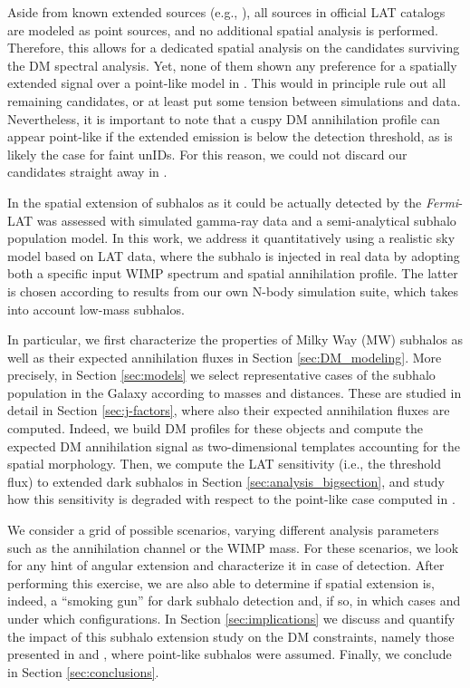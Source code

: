 \documentclass[%
 reprint,
nofootinbib,
 amsmath,amssymb,
 aps,
]{revtex4-2}
\begin{document}
Aside from known extended sources (e.g., \cite{Ackermann_2018}), all sources in official LAT catalogs \cite{2015ApJS..218...23A, 2016ApJS..222....5A, 2017ApJS..232...18A, 2020ApJS..247...33A} are modeled as point sources, and no additional spatial analysis is performed. Therefore, this allows for a dedicated spatial analysis on the candidates surviving the DM spectral analysis. Yet, none of them shown any preference for a spatially extended signal over a point-like model in . This would in principle rule out all remaining candidates, or at least put some tension between simulations and data. Nevertheless, it is important to note that a cuspy DM annihilation profile can appear point-like if the extended emission is below the detection threshold, as is likely the case for faint unIDs. For this reason, we could not discard our candidates straight away in .

{  In \cite{Mauro2020} the spatial extension of subhalos as it could be actually detected by the \textit{Fermi}-LAT was assessed with simulated gamma-ray data and a semi-analytical subhalo population model.} In this work, we address it quantitatively using a realistic sky model based on LAT data, where the subhalo is injected in real data by adopting both a specific input WIMP spectrum and spatial annihilation profile. The latter is chosen according to results from our own N-body simulation suite, which takes into account low-mass subhalos.

In particular, we first characterize the properties of Milky Way (MW) subhalos as well as their expected annihilation fluxes in Section \ref{sec:DM_modeling}. More precisely, in Section \ref{sec:models} we select {  representative cases of the subhalo population in the Galaxy according to masses and distances.} These are studied in detail in Section \ref{sec:j-factors}, where also their expected annihilation fluxes are computed. Indeed, we build DM profiles for these objects and compute the expected DM annihilation signal as two-dimensional templates accounting for the spatial morphology. Then, we compute the LAT sensitivity (i.e., the threshold flux) to extended dark subhalos in Section \ref{sec:analysis_bigsection}, and study how this sensitivity is degraded with respect to the point-like case computed in . 

We consider a grid of possible scenarios, varying different analysis parameters such as the annihilation channel or the WIMP mass. For these scenarios, we look for any hint of angular extension and characterize it in case of detection. After performing this exercise, we are also able to determine if spatial extension is, indeed, a ``smoking gun'' for dark subhalo detection and, if so, in which cases and under which configurations. In Section \ref{sec:implications} we  discuss and quantify the impact of this subhalo extension study on the DM constraints, namely those presented in  and , where point-like subhalos were assumed. Finally, we conclude in Section \ref{sec:conclusions}.
\end{document}
